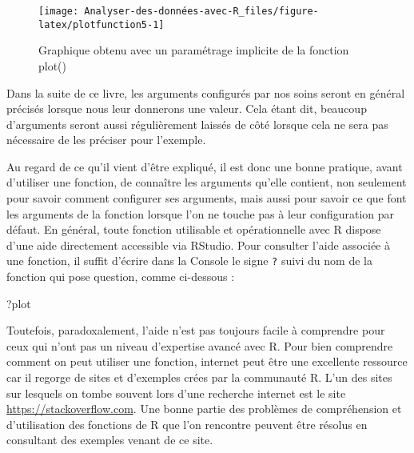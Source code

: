 \documentclass[
  french,
]{book}
\newenvironment{Shaded}{\begin{snugshade}}{\end{snugshade}}
\newcommand{\KeywordTok}[1]{\textcolor[rgb]{0.13,0.29,0.53}{\textbf{#1}}}
\newcommand{\NormalTok}[1]{#1}
\newcommand{\OperatorTok}[1]{\textcolor[rgb]{0.81,0.36,0.00}{\textbf{#1}}}
\begin{document}
\begin{Shaded}
\end{Shaded}

\begin{figure}

{\centering \texttt{[image: Analyser-des-données-avec-R\_files/figure-latex/plotfunction5-1]} 

}

\caption{Graphique obtenu avec un paramétrage implicite de la fonction plot()}\label{fig:plotfunction5}
\end{figure}

Dans la suite de ce livre, les arguments configurés par nos soins seront en général précisés lorsque nous leur donnerons une valeur. Cela étant dit, beaucoup d'arguments seront aussi régulièrement laissés de côté lorsque cela ne sera pas nécessaire de les préciser pour l'exemple.

Au regard de ce qu'il vient d'être expliqué, il est donc une bonne pratique, avant d'utiliser une fonction, de connaître les arguments qu'elle contient, non seulement pour savoir comment configurer ses arguments, mais aussi pour savoir ce que font les arguments de la fonction lorsque l'on ne touche pas à leur configuration par défaut. En général, toute fonction utilisable et opérationnelle avec R dispose d'une aide directement accessible via RStudio. Pour consulter l'aide associée à une fonction, il suffit d'écrire dans la Console le signe \texttt{?} suivi du nom de la fonction qui pose question, comme ci-dessous :

\begin{Shaded}
\begin{Highlighting}[]
\NormalTok{?plot}
\end{Highlighting}
\end{Shaded}

Toutefois, paradoxalement, l'aide n'est pas toujours facile à comprendre pour ceux qui n'ont pas un niveau d'expertise avancé avec R. Pour bien comprendre comment on peut utiliser une fonction, internet peut être une excellente ressource car il regorge de sites et d'exemples crées par la communauté R. L'un des sites sur lesquels on tombe souvent lors d'une recherche internet est le site \url{https://stackoverflow.com}. Une bonne partie des problèmes de compréhension et d'utilisation des fonctions de R que l'on rencontre peuvent être résolus en consultant des exemples venant de ce site.
\end{document}
